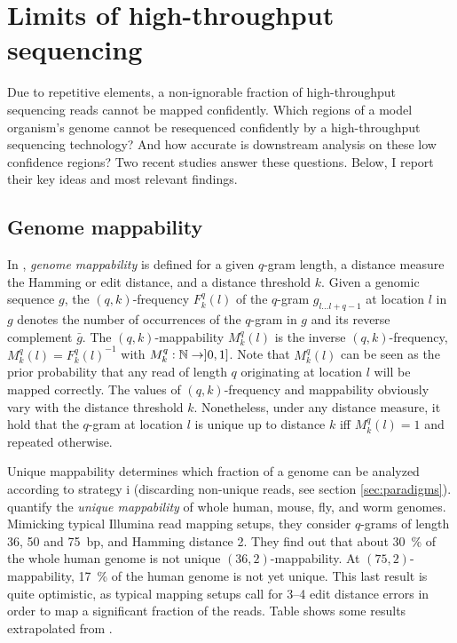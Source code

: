 
\section{Limits of high-throughput sequencing}
\label{sec:mappability}

Due to repetitive elements, a non-ignorable fraction of high-throughput sequencing reads cannot be mapped confidently.
Which regions of a model organism's genome cannot be resequenced confidently by a high-throughput sequencing technology?
And how accurate is downstream analysis on these low confidence regions?
Two recent studies \citep{Derrien2012, Lee2012} answer these questions.
Below, I report their key ideas and most relevant findings.

\subsection{Genome mappability}

In \citep{Derrien2012}, \emph{genome mappability} is defined for a given $q$-gram length, a distance measure \ie the Hamming or edit distance, and a distance threshold $k$.
Given a genomic sequence $g$, the $(q,k)$-frequency $F^q_k(l)$ of the $q$-gram $g_{l \dots l+q-1}$ at location $l$ in $g$ denotes the number of occurrences of the $q$-gram in $g$ and its reverse complement $\bar{g}$.
The $(q,k)$-mappability $M^q_k(l)$ is the inverse $(q,k)$-frequency, \ie $M^q_k(l) = {F^q_k(l)}^{-1}$ with $M^q_k : \mathbb {N} \rightarrow ]0,1]$.
Note that $M^q_k(l)$ can be seen as the prior probability that any read of length $q$ originating at location $l$ will be mapped correctly.
The values of $(q,k)$-frequency and mappability obviously vary with the distance threshold $k$. Nonetheless, under any distance measure, it hold that the $q$-gram at location $l$ is unique up to distance $k$ iff $M^q_k(l) = 1$ and repeated otherwise.

Unique mappability determines which fraction of a genome can be analyzed according to strategy i (\ie discarding non-unique reads, see section \ref{sec:paradigms}).
\citeauthor{Derrien2012} quantify the \emph{unique mappability} of whole human, mouse, fly, and worm genomes.
Mimicking typical Illumina read mapping setups, they consider $q$-grams of length 36, 50 and 75~bp, and Hamming distance 2.
They find out that about 30~\% of the whole human genome is not unique \wrt $(36,2)$-mappability.
At $(75,2)$-mappability, 17~\% of the human genome is not yet unique.
This last result is quite optimistic, as typical mapping setups call for 3--4 edit distance errors in order to map a significant fraction of the reads.
Table \label{tab:mappability} shows some results extrapolated from \citep{Derrien2012}.

